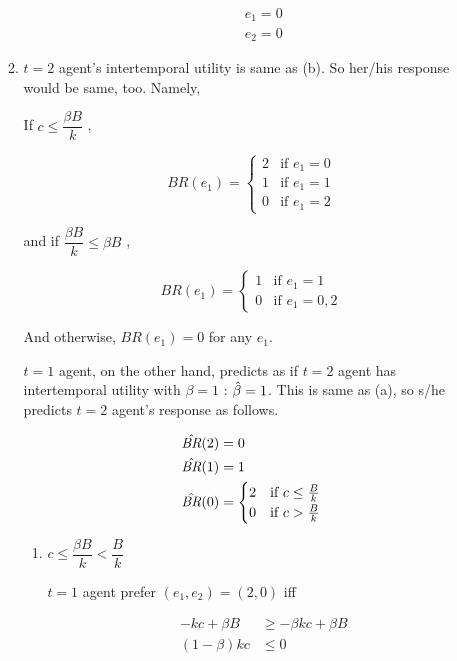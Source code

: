 \documentclass{jsarticle}
\begin{document}
\begin{enumerate}
\begin{enumerate}
\begin{itemize}
\begin{align*}
e_1=0 \\
e_2=0
\end{align*}

\end{itemize}

\newpage

\item


$t=2$ agent's intertemporal utility is same as (b). So her/his response would be same, too. Namely,

If $c \leq \dfrac{\beta B}{k}$ ,

\[\textit{BR}(e_1) = \begin{cases}
2 & \text{if } e_1 = 0 \\
1 & \text{if } e_1 = 1 \\
0 & \text{if } e_1 = 2
\end{cases} \]

and if $\dfrac{\beta B}{k} \leq \beta B$ ,

\[\textit{BR}(e_1) = \begin{cases}
1 & \text{if } e_1 = 1 \\
0 & \text{if } e_1 = 0,2
\end{cases} \]

And otherwise, $\textit{BR}(e_1) =0$ for any $e_1$.

$t=1$ agent, on the other hand, predicts as if $t=2$ agent has intertemporal utility with $\beta=1$ : $\Hat{\beta} = 1$. This is same as (a), so s/he predicts $t=2$ agent's response as follows.

\begin{align*}
\Hat{\textit{BR}}(2) &= 0 \\
\Hat{\textit{BR}}(1) &= 1 \\
\Hat{\textit{BR}}(0) &= \begin{cases}
2 & \text{if } c \leq \frac{B}{k} \\
0 & \text{if } c > \frac{B}{k}
\end{cases}
\end{align*}

\begin{enumerate}

\item $c \leq \dfrac{\beta B}{k} < \dfrac{B}{k}$

$t=1$ agent prefer $(e_1,e_2) = (2,0)$ iff

\begin{align*}
- kc +\beta B &\geq -\beta kc + \beta B \\
(1 - \beta)kc &\leq 0
\end{align*}


\end{enumerate}
\end{enumerate}
\end{enumerate}
\end{document}
